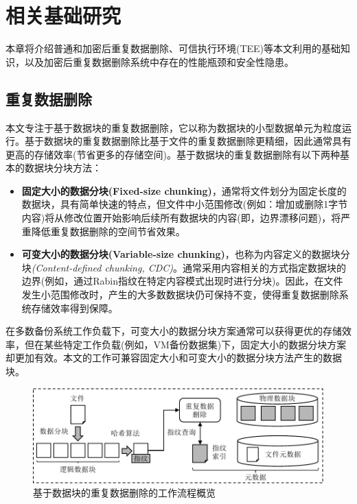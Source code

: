 \chapter{相关基础研究}
\label{chapter:background}

本章将介绍普通和加密后重复数据删除、可信执行环境(TEE)等本文利用的基础知识，以及加密后重复数据删除系统中存在的性能瓶颈和安全性隐患。

\section{重复数据删除}
\label{sec:background-deduplication}

本文专注于基于数据块的重复数据删除，它以称为数据块的小型数据单元为粒度运行。基于数据块的重复数据删除比基于文件的重复数据删除更精细，因此通常具有更高的存储效率(节省更多的存储空间)。基于数据块的重复数据删除有以下两种基本的数据块分块方法：

\begin{itemize}[leftmargin=0em]
    \item \textbf{固定大小的数据分块(Fixed-size chunking)}，通常将文件划分为固定长度的数据块，具有简单快速的特点，但文件中小范围修改(例如：增加或删除1字节内容)将从修改位置开始影响后续所有数据块的内容(即，边界漂移问题\cite{muthitacharoen2001low})，将严重降低重复数据删除的空间节省效果。
    \item \textbf{可变大小的数据分块(Variable-size chunking)}，也称为内容定义的数据块分块\textit{(Content-defined chunking, CDC)}。通常采用内容相关的方式指定数据块的边界(例如，通过Rabin指纹\cite{rabin1981fingerprinting}在特定内容模式出现时进行分块)。因此，在文件发生小范围修改时，产生的大多数数据块仍可保持不变，使得重复数据删除系统存储效率得到保障。
\end{itemize}

在多数备份系统工作负载\cite{zhu2008avoiding,lillibridge2009sparse}下，可变大小的数据分块方案通常可以获得更优的存储效率，但在某些特定工作负载(例如，VM备份数据集\cite{jin2009effectiveness})下，固定大小的数据分块方案却更加有效。本文的工作可兼容固定大小和可变大小的数据分块方法产生的数据块。

\begin{figure}[!htb]
    \small
    \centering
    \includegraphics[width=\textwidth]{pic/background/chunk-based-dedup-arch.pdf}
    \caption{基于数据块的重复数据删除的工作流程概览}
    \label{fig:chunk-based-dedup-flow}
\end{figure}

